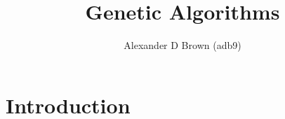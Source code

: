 \documentclass[11pt,a4paper,draft]{article}
\title{Genetic Algorithms}
\author{Alexander D Brown (adb9)}
\begin{document}
\maketitle
\tableofcontents

\newpage
\section{Introduction}

\nocite{Man1996Genetic}


\end{document}
